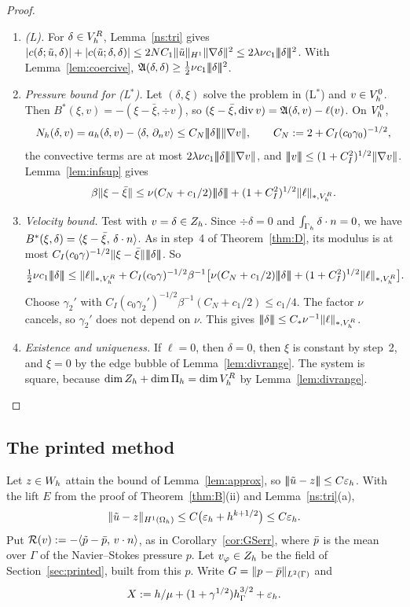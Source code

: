 \begin{proof}
\begin{enumerate}
\item \emph{(L).} For $\delta\in V_h^R$, Lemma~\ref{ns:tri} gives $|c(\delta;\tilde u,\delta)|+|c(\tilde u;\delta,\delta)|\le2NC_1\lVert \tilde u\rVert_{H^1}\lVert \nabla\delta\rVert^2\le2\lambda\nu c_1|\!|\!|\delta|\!|\!|^2$. With Lemma~\ref{lem:coercive}, $\mathfrak A(\delta,\delta)\ge\frac12\nu c_1|\!|\!|\delta|\!|\!|^2$.
\item \emph{Pressure bound for (L$^\ast$).} Let $(\delta,\xi)$ solve the problem in (L$^\ast$) and $v\in V_h^0$. Then $B^\ast(\xi,v)=-(\xi-\bar\xi,\div v)$, so $(\xi-\bar\xi,\operatorname{div} v)=\mathfrak A(\delta,v)-\ell(v)$. On $V_h^0$,
\[
N_h(\delta,v)=a_h(\delta,v)-\langle \delta,\, \partial_n v\rangle\le C_N|\!|\!|\delta|\!|\!|\lVert \nabla v\rVert,\qquad C_N:=2+C_I(c_0\gamma_0)^{-1/2},
\]
the convective terms are at most $2\lambda\nu c_1|\!|\!|\delta|\!|\!|\lVert \nabla v\rVert$, and $|\!|\!|v|\!|\!|\le(1+C_I^2)^{1/2}\lVert \nabla v\rVert$. Lemma~\ref{lem:infsup} gives
\[
\beta\lVert \xi-\bar\xi\rVert\le\nu(C_N+c_1/2)|\!|\!|\delta|\!|\!|+(1+C_I^2)^{1/2}\lVert \ell\rVert_{\ast,V_h^R}.
\]
\item \emph{Velocity bound.} Test with $v=\delta\in Z_h$. Since $\div\delta=0$ and $\int_{\Gamma_h}\delta\cdot n=0$, we have $B^\ast(\xi,\delta)=\langle \xi-\bar\xi,\, \delta\cdot n\rangle$. As in step~4 of Theorem~\ref{thm:D}, its modulus is at most $C_I(c_0\gamma)^{-1/2}\lVert \xi-\bar\xi\rVert|\!|\!|\delta|\!|\!|$. So
\[
\tfrac12\nu c_1\tnorm\delta\le\norm\ell_{\ast,\VR}+C_I(c_0\gamma)^{-1/2}\beta^{-1}\bigl[\nu(C_N+c_1/2)\tnorm\delta+(1+C_I^2)^{1/2}\norm\ell_{\ast,\VR}\bigr].
\]
Choose $\gamma_2'$ with $C_I(c_0\gamma_2')^{-1/2}\beta^{-1}(C_N+c_1/2)\le c_1/4$. The factor $\nu$ cancels, so $\gamma_2'$ does not depend on $\nu$. This gives $|\!|\!|\delta|\!|\!|\le C_\ast\nu^{-1}\lVert \ell\rVert_{\ast,V_h^R}$.
\item \emph{Existence and uniqueness.} If $\ell=0$, then $\delta=0$, then $\xi$ is constant by step~2, and $\xi=0$ by the edge bubble of Lemma~\ref{lem:divrange}. The system is square, because $\dim Z_h+\dim\Pi_h=\dim V_h^R$ by Lemma~\ref{lem:divrange}.\qedhere
\end{enumerate}
\end{proof}

\subsection{The printed method}
Let $z\in W_h$ attain the bound of Lemma~\ref{lem:approx}, so $|\!|\!|\tilde u-z|\!|\!|\le C\varepsilon_h$. With the lift $E$ from the proof of Theorem~\ref{thm:B}(ii) and Lemma~\ref{ns:tri}(a),
\begin{equation}\label{ns:zH1}
\lVert \tilde u-z\rVert_{H^1(\Omega_h)}\le C\bigl(\varepsilon_h+h^{k+1/2}\bigr)\le C\varepsilon_h .
\end{equation}
Put $\mathcal R(v):=-\langle \tilde p-\bar p,\, v\cdot n\rangle$, as in Corollary~\ref{cor:GSerr}, where $\bar p$ is the mean over $\Gamma$ of the Navier--Stokes pressure $p$. Let $v_\varphi\in Z_h$ be the field of Section~\ref{sec:printed}, built from this $p$. Write $G=\lVert p-\bar p\rVert_{L^2(\Gamma)}$ and
\[
X:=h/\mu+(1+\gamma^{1/2})h_\Gamma^{3/2}+\varepsilon_h .
\]

